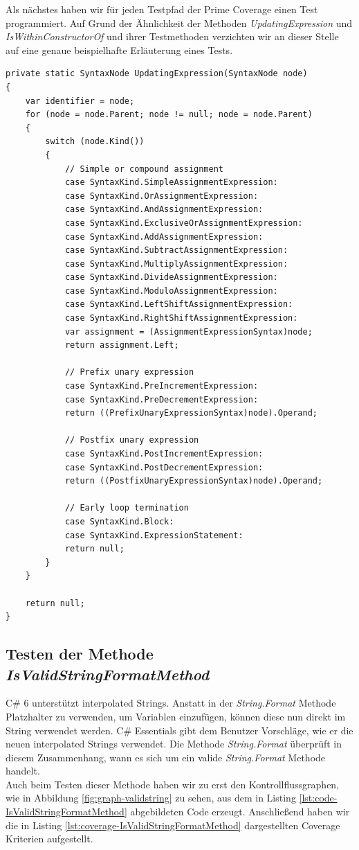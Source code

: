 Als nächstes haben wir für jeden Testpfad der Prime Coverage einen Test programmiert. Auf Grund der Ähnlichkeit der Methoden \textit{UpdatingExpression} und \textit{IsWithinConstructorOf} und ihrer Testmethoden verzichten wir an dieser Stelle auf eine genaue beispielhafte Erläuterung eines Tests.\newpage
\begin{lstlisting}[caption={Mehtode \textit{UpdatingExpression}},
label=lst:code-UpdatingExpression]
private static SyntaxNode UpdatingExpression(SyntaxNode node)
{
	var identifier = node;
 	for (node = node.Parent; node != null; node = node.Parent)
 	{
 		switch (node.Kind())
 		{
 			// Simple or compound assignment
 			case SyntaxKind.SimpleAssignmentExpression:
 			case SyntaxKind.OrAssignmentExpression:
 			case SyntaxKind.AndAssignmentExpression:
 			case SyntaxKind.ExclusiveOrAssignmentExpression:
 			case SyntaxKind.AddAssignmentExpression:
 			case SyntaxKind.SubtractAssignmentExpression:
 			case SyntaxKind.MultiplyAssignmentExpression:
 			case SyntaxKind.DivideAssignmentExpression:
 			case SyntaxKind.ModuloAssignmentExpression:
 			case SyntaxKind.LeftShiftAssignmentExpression:
 			case SyntaxKind.RightShiftAssignmentExpression:
 			var assignment = (AssignmentExpressionSyntax)node;
 			return assignment.Left;
 			
 			// Prefix unary expression
 			case SyntaxKind.PreIncrementExpression:
 			case SyntaxKind.PreDecrementExpression:
 			return ((PrefixUnaryExpressionSyntax)node).Operand;
 			
 			// Postfix unary expression
 			case SyntaxKind.PostIncrementExpression:
 			case SyntaxKind.PostDecrementExpression:
 			return ((PostfixUnaryExpressionSyntax)node).Operand;
 			
 			// Early loop termination
 			case SyntaxKind.Block:
 			case SyntaxKind.ExpressionStatement:
 			return null;
 		}
 	}
 	
	return null;
}
\end{lstlisting}
\subsection{Testen der Methode \textit{IsValidStringFormatMethod}}
C\# 6 unterstützt interpolated Strings. Anstatt in der \textit{String.Format} Methode Platzhalter zu verwenden, um Variablen einzufügen, können diese nun direkt im String verwendet werden.\cite{csharp6} C\# Essentials gibt dem Benutzer Vorschläge, wie er die neuen interpolated Strings verwendet. Die Methode \textit{String.Format} überprüft in diesem Zusammenhang, wann es sich um ein valide \textit{String.Format} Methode handelt.\\
Auch beim Testen dieser Methode haben wir zu erst den Kontrollflussgraphen, wie in Abbildung \ref{fig:graph-validstring} zu sehen, aus dem in Listing \ref{lst:code-IsValidStringFormatMethod} abgebildeten Code erzeugt. Anschließend haben wir die in Listing \ref{lst:coverage-IsValidStringFormatMethod} dargestellten Coverage Kriterien aufgestellt.

